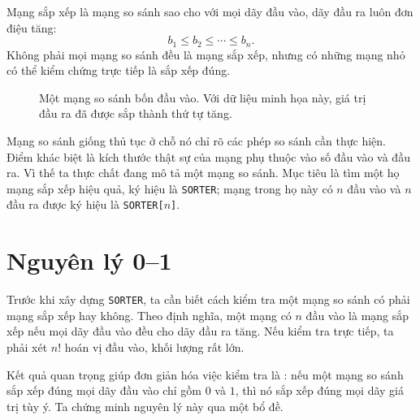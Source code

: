 \documentclass[11pt]{article}
\newcommand{\comp}[3]{%
  \draw (#1,#2) -- (#1,#3);
  \fill (#1,#2) circle (1.6pt);
  \fill (#1,#3) circle (1.6pt);
}
\begin{document}
Mạng sắp xếp là mạng so sánh sao cho với mọi dãy đầu vào, dãy đầu ra luôn đơn
điệu tăng:
\[
  b_1\le b_2\le\cdots\le b_n.
\]
Không phải mọi mạng so sánh đều là mạng sắp xếp, nhưng có những mạng nhỏ có
thể kiểm chứng trực tiếp là sắp xếp đúng.

\begin{figure}[ht]
\centering
{}
\caption{Một mạng so sánh bốn đầu vào. Với dữ liệu minh họa này, giá trị đầu
ra đã được sắp thành thứ tự tăng.}
\end{figure}

Mạng so sánh giống thủ tục ở chỗ nó chỉ rõ các phép so sánh cần thực hiện.
Điểm khác biệt là kích thước thật sự của mạng phụ thuộc vào số đầu vào và đầu
ra. Vì thế ta thực chất đang mô tả một  mạng so sánh. Mục tiêu là tìm
một họ mạng sắp xếp hiệu quả, ký hiệu là \texttt{SORTER}; mạng trong họ này có
$n$ đầu vào và $n$ đầu ra được ký hiệu là \texttt{SORTER[$n$]}.

\section{Nguyên lý 0--1}

Trước khi xây dựng \texttt{SORTER}, ta cần biết cách kiểm tra một mạng so sánh
có phải mạng sắp xếp hay không. Theo định nghĩa, một mạng có $n$ đầu vào là
mạng sắp xếp nếu mọi dãy đầu vào đều cho dãy đầu ra tăng. Nếu kiểm tra trực
tiếp, ta phải xét $n!$ hoán vị đầu vào, khối lượng rất lớn.

Kết quả quan trọng giúp đơn giản hóa việc kiểm tra là :
nếu một mạng so sánh sắp xếp đúng mọi dãy đầu vào chỉ gồm $0$ và $1$, thì nó
sắp xếp đúng mọi dãy giá trị tùy ý. Ta chứng minh nguyên lý này qua một bổ đề.
\end{document}
